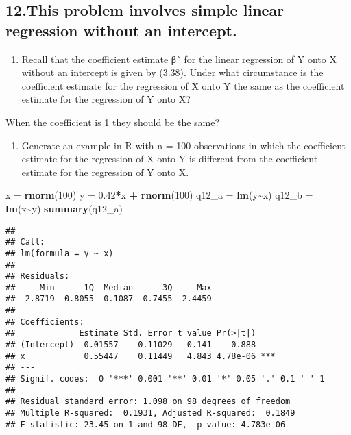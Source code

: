 \documentclass[
]{article}
\newenvironment{Shaded}{\begin{snugshade}}{\end{snugshade}}
\newcommand{\DecValTok}[1]{\textcolor[rgb]{0.00,0.00,0.81}{#1}}
\newcommand{\FloatTok}[1]{\textcolor[rgb]{0.00,0.00,0.81}{#1}}
\newcommand{\FunctionTok}[1]{\textcolor[rgb]{0.13,0.29,0.53}{\textbf{#1}}}
\newcommand{\NormalTok}[1]{#1}
\newcommand{\OtherTok}[1]{\textcolor[rgb]{0.56,0.35,0.01}{#1}}
\newcommand{\SpecialCharTok}[1]{\textcolor[rgb]{0.81,0.36,0.00}{\textbf{#1}}}
\providecommand{\tightlist}{%
  \setlength{\itemsep}{0pt}\setlength{\parskip}{0pt}}
\begin{document}
\hypertarget{this-problem-involves-simple-linear-regression-without-an-intercept.}{%
\subsection{12.This problem involves simple linear regression without an
intercept.}\label{this-problem-involves-simple-linear-regression-without-an-intercept.}}

\begin{enumerate}
\def\labelenumi{(\alph{enumi})}
\tightlist
\item
  Recall that the coefficient estimate βˆ for the linear regression of Y
  onto X without an intercept is given by (3.38). Under what
  circumstance is the coefficient estimate for the regression of X onto
  Y the same as the coefficient estimate for the regression of Y onto X?
\end{enumerate}

When the coefficient is 1 they should be the same?

\begin{enumerate}
\def\labelenumi{(\alph{enumi})}
\setcounter{enumi}{1}
\tightlist
\item
  Generate an example in R with n = 100 observations in which the
  coefficient estimate for the regression of X onto Y is different from
  the coefficient estimate for the regression of Y onto X.
\end{enumerate}

\begin{Shaded}
\begin{Highlighting}[]
\NormalTok{x }\OtherTok{=} \FunctionTok{rnorm}\NormalTok{(}\DecValTok{100}\NormalTok{)}
\NormalTok{y }\OtherTok{=} \FloatTok{0.42}\SpecialCharTok{*}\NormalTok{x }\SpecialCharTok{+} \FunctionTok{rnorm}\NormalTok{(}\DecValTok{100}\NormalTok{)}
\NormalTok{q12\_a }\OtherTok{=} \FunctionTok{lm}\NormalTok{(y}\SpecialCharTok{\textasciitilde{}}\NormalTok{x)}
\NormalTok{q12\_b }\OtherTok{=} \FunctionTok{lm}\NormalTok{(x}\SpecialCharTok{\textasciitilde{}}\NormalTok{y)}
\FunctionTok{summary}\NormalTok{(q12\_a)}
\end{Highlighting}
\end{Shaded}

\begin{verbatim}
## 
## Call:
## lm(formula = y ~ x)
## 
## Residuals:
##     Min      1Q  Median      3Q     Max 
## -2.8719 -0.8055 -0.1087  0.7455  2.4459 
## 
## Coefficients:
##             Estimate Std. Error t value Pr(>|t|)    
## (Intercept) -0.01557    0.11029  -0.141    0.888    
## x            0.55447    0.11449   4.843 4.78e-06 ***
## ---
## Signif. codes:  0 '***' 0.001 '**' 0.01 '*' 0.05 '.' 0.1 ' ' 1
## 
## Residual standard error: 1.098 on 98 degrees of freedom
## Multiple R-squared:  0.1931, Adjusted R-squared:  0.1849 
## F-statistic: 23.45 on 1 and 98 DF,  p-value: 4.783e-06
\end{verbatim}
\end{document}
